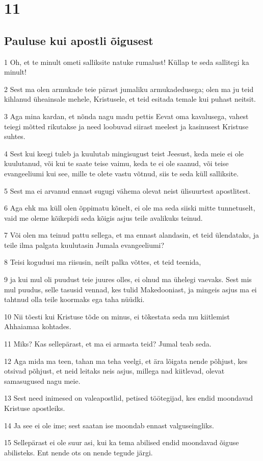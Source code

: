 \chapter{11}

\section*{Pauluse kui apostli õigusest}

\par 1 Oh, et te minult ometi salliksite natuke rumalust! Küllap te seda sallitegi ka minult!
\par 2 Sest ma olen armukade teie pärast jumaliku armukadedusega; olen ma ju teid kihlanud üheainsale mehele, Kristusele, et teid esitada temale kui puhast neitsit.
\par 3 Aga mina kardan, et nõnda nagu madu pettis Eevat oma kavalusega, vahest teiegi mõtted rikutakse ja need loobuvad siirast meelest ja kasinusest Kristuse suhtes.
\par 4 Sest kui keegi tuleb ja kuulutab mingisugust teist Jeesust, keda meie ei ole kuulutanud, või kui te saate teise vaimu, keda te ei ole saanud, või teise evangeeliumi kui see, mille te olete vastu võtnud, siis te seda küll salliksite.
\par 5 Sest ma ei arvanud ennast sugugi vähema olevat neist ülisuurtest apostlitest.
\par 6 Aga ehk ma küll olen õppimatu kõnelt, ei ole ma seda siiski mitte tunnetuselt, vaid me oleme kõikepidi seda kõigis asjus teile avalikuks teinud.
\par 7 Või olen ma teinud pattu sellega, et ma ennast alandasin, et teid ülendataks, ja teile ilma palgata kuulutasin Jumala evangeeliumi?
\par 8 Teisi kogudusi ma riisusin, neilt palka võttes, et teid teenida,
\par 9 ja kui mul oli puudust teie juures olles, ei olnud ma ühelegi vaevaks. Sest mis mul puudus, selle tasusid vennad, kes tulid Makedooniast, ja mingeis asjus ma ei tahtnud olla teile koormaks ega taha nüüdki.
\par 10 Nii tõesti kui Kristuse tõde on minus, ei tõkestata seda mu kiitlemist Ahhaiamaa kohtades.
\par 11 Miks? Kas sellepärast, et ma ei armasta teid? Jumal teab seda.
\par 12 Aga mida ma teen, tahan ma teha veelgi, et ära lõigata nende põhjust, kes otsivad põhjust, et neid leitaks neis asjus, millega nad kiitlevad, olevat samasugused nagu meie.
\par 13 Sest need inimesed on valeapostlid, petised töötegijad, kes endid moondavad Kristuse apostleiks.
\par 14 Ja see ei ole ime; sest saatan ise moondab ennast valguseingliks.
\par 15 Sellepärast ei ole suur asi, kui ka tema abilised endid moondavad õiguse abilisteks. Ent nende ots on nende tegude järgi.

